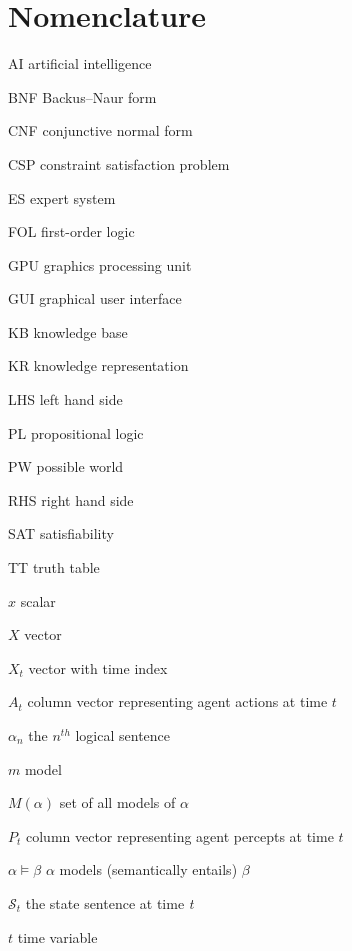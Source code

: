 \chapter{Nomenclature}
\label{nomenclature}

\begin{Nomencl}[4em]
	
	\item[AI] artificial intelligence
	\item[BNF] Backus–Naur form  
	\item[CNF] conjunctive normal form
	\item[CSP] constraint satisfaction problem
	\item[ES] expert system 	
	\item[FOL] first-order logic
	\item[GPU] graphics processing unit
	\item[GUI] graphical user interface
    \item[KB] knowledge base
    \item[KR] knowledge representation
    \item[LHS] left hand side
    \item[PL] propositional logic
    \item[PW] possible world
    \item[RHS] right hand side
    \item[SAT] satisfiability
    \item[TT] truth table
    
   
	\item[$x$] scalar
	\item[${X}$] vector
   	\item[${X}_t$] vector with time index 



   
  	 \item[${A}_t$] column vector representing agent actions at time $t$
   	\item[$\alpha_n$]  the $n^{th}$ logical sentence
   	\item[$m$]  model
   	\item[$M(\alpha)$]  set of all models of $\alpha$
	\item[${P}_t$] column vector representing agent percepts at time $t$  
   	\item[$\alpha \models \beta$]  $\alpha$ models (semantically entails) $\beta$
   	\item[$\mathcal{S}_t$] the state sentence at time \textit{t}
   	\item[$t$] time variable



\end{Nomencl}


\endinput
